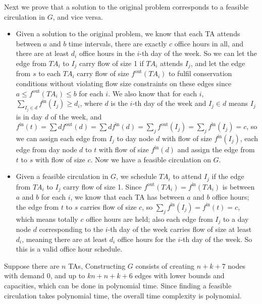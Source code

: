 \documentclass[12pt,letterpaper]{article}
\begin{document}
Next we prove that a solution to the original problem corresponds to a feasible circulation in $G$, and vice versa.
\begin{itemize}
\item Given a solution to the original problem, we know that each TA attends between $a$ and $b$ time intervals, there are exactly $c$ office hours in all, and there are at least $d_i$ office hours in the $i$-th day of the week. So we can let the edge from $TA_i$ to $I_j$ carry flow of size 1 if $TA_i$ attends $I_j$, and let the edge from $s$ to each $TA_i$ carry flow of size $f^{\textrm{out}}(TA_i)$ to fulfil conservation conditions without violating flow size constraints on these edges since $a\le f^{\textrm{out}}(TA_i)\le b$ for each $i$. We also know that for each $i$, $\sum_{I_j\in d}f^{\textrm{in}}(I_j)\ge d_i$, where $d$ is the $i$-th day of the week and $I_j\in d$ means $I_j$ is in day $d$ of the week, and $f^{\textrm{in}}(t)=\sum{d}f^{\textrm{out}}(d)=\sum{d}f^{\textrm{in}}(d)=\sum_{j}f^{\textrm{out}}(I_j)=\sum_{j}f^{\textrm{in}}(I_j)=c$, so we can assign each edge from $I_j$ to day node $d$ with flow of size $f^{\textrm{in}}(I_j)$, each edge from day node $d$ to $t$ with flow of size $f^{\textrm{in}}(d)$ and assign the edge from $t$ to $s$ with flow of size $c$. Now we have a feasible circulation on $G$.
\item Given a feasible circulation in $G$, we schedule $TA_i$ to attend $I_j$ if the edge from $TA_i$ to $I_j$ carry flow of size 1. Since $f^{\textrm{out}}(TA_i)=f^{\textrm{in}}(TA_i)$ is between $a$ and $b$ for each $i$, we know that each TA has between $a$ and $b$ office hours; the edge from $t$ to $s$ carries flow of size $c$, so $\sum_{j}f^{\textrm{in}}(I_j)=f^{\textrm{in}}(t)=c$, which means totally $c$ office hours are held; also each edge from $I_j$ to a day node $d$ corresponding to the $i$-th day of the week carries flow of size at least $d_i$, meaning there are at least $d_i$ office hours for the $i$-th day of the week. So this is a valid office hour schedule.
\end{itemize}

Suppose there are $n$ TAs, Constructing $G$ consists of creating $n+k+7$ nodes with demand 0, and up to $kn+n+k+6$ edges with lower bounds and capacities, which can be done in polynomial time. Since finding a feasible circulation takes polynomial time, the overall time complexity is polynomial.
\end{document}
